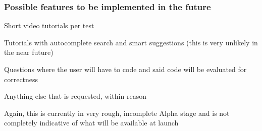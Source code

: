 \subsubsection*{Possible features to be implemented in the future}


\begin{DoxyItemize}
\item Short video tutorials per test
\item Tutorials with autocomplete search and smart suggestions (this is very unlikely in the near future)
\item Questions where the user will have to code and said code will be evaluated for correctness
\item Anything else that is requested, within reason
\end{DoxyItemize}

Again, this is currently in very rough, incomplete Alpha stage and is not completely indicative of what will be available at launch 